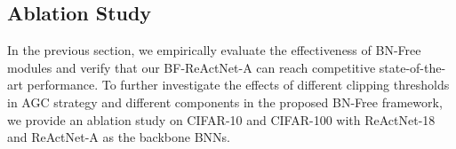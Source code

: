 \documentclass[final]{cvpr}
\begin{document}
\begin{table}[t]
\caption{\small Comparison of the top-1 accuracy between the three variants (i.e., BN, w/o BN, BN-Free) of binary networks on CIFAR-10 and CIFAR-100. All networks are modified from ResNet-18 except for ReActNet-A, which is constructed from MobileNetv1.}
\vspace{1mm}
\label{tab:result_cifar}
\centering
{}
\end{table}

\begin{table}[t]
\caption{\small Ablation Study of clipping threshold values in AGC on CIFAR-10/100 with ReActNet-18 and ReActNet-A.}
\vspace{1mm}
\label{tab:ablation_agc_cifar100}
\centering
{}
\end{table}

\subsection{Ablation Study}
In the previous section, we empirically evaluate the effectiveness of BN-Free modules and verify that our BF-ReActNet-A can reach competitive state-of-the-art performance.
To further investigate the effects of different clipping thresholds in AGC strategy and different components in the proposed BN-Free framework, we provide an ablation study on CIFAR-10 and CIFAR-100 with ReActNet-18 and ReActNet-A as the backbone BNNs.
\end{document}

